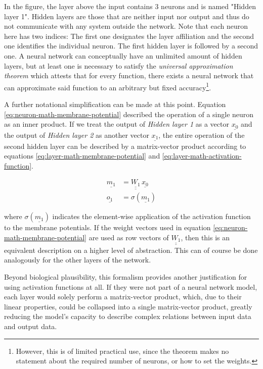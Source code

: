 \documentclass[11pt, a4paper]{article}
\newcommand\braces[1]{\left(#1\right)}
\renewcommand{\vec}[1]{\underline{#1}}
\newcommand{\mat}[1]{\underline{\underline{#1}}}
\begin{document}
In the figure, the layer above the input contains 3 neurons and is named "Hidden layer 1". Hidden layers are those that are neither input nor output and thus do not communicate with any system outside the network. Note that each neuron here has two indices: The first one designates the layer affiliation and the second one identifies the individual neuron. The first hidden layer is followed by a second one. A neural network can conceptually have an unlimited amount of hidden layers, but at least one is necessary to satisfy the \emph{universal approximation theorem} which attests that for every function, there exists a neural network that can approximate said function to an arbitrary but fixed accuracy\footnote{However, this is of limited practical use, since the theorem makes no statement about the required number of neurons, or how to set the weights.}.

A further notational simplification can be made at this point. Equation \eqref{eq:neuron-math-membrane-potential} described the operation of a single neuron as an inner product. If we treat the output of \emph{Hidden layer 1} as a vector $\vec{x_0}$ and the output of \emph{Hidden layer 2} as another vector $\vec{x_1}$, the entire operation of the second hidden layer can be described by a matrix-vector product according to equations \eqref{eq:layer-math-membrane-potential} and \eqref{eq:layer-math-activation-function}.

\begin{align}
	\vec{m_1} &= \mat{W_{1}} \, \vec{x_0} \label{eq:layer-math-membrane-potential} \\
	\vec{o_1} &= \sigma \braces{\vec{m_1}} \label{eq:layer-math-activation-function}
\end{align}

where $\sigma \braces{\vec{m_1}}$ indicates the element-wise application of the activation function to the membrane potentials. If the weight vectors used in equation \eqref{eq:neuron-math-membrane-potential} are used as row vectors of $\mat{W_1}$, then this is an equivalent description on a higher level of abstraction. This can of course be done analogously for the other layers of the network.

Beyond biological plausibility, this formalism provides another justification for using activation functions at all. If they were not part of a neural network model, each layer would solely perform a matrix-vector product, which, due to their linear properties, could be collapsed into a single matrix-vector product, greatly reducing the model's capacity to describe complex relations between input data and output data.
\end{document}
